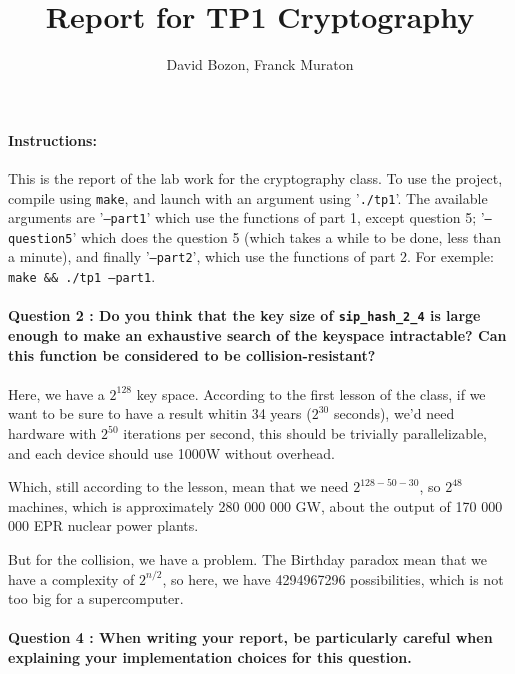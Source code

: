 \documentclass[4apaper]{report}
\author{David Bozon, Franck Muraton}
\begin{document}
\title{Report for TP1 Cryptography}
\maketitle

\paragraph{Instructions: \\} This is the report of the lab work for the cryptography class. To use the project, compile using \texttt{make}, and launch with an argument using '\texttt{./tp1}'. The available arguments are '\texttt{--part1}' which use the functions of part 1, except question 5; '\texttt{--question5}' which does the question 5 (which takes a while to be done, less than a minute), and finally '\texttt{--part2}', which use the functions of part 2. For exemple: \texttt{make \&\& ./tp1 --part1}.

\paragraph{Question 2 : Do you think that the key size of \texttt{sip\_hash\_2\_4} is large enough to make an exhaustive search of the keyspace intractable? Can this function be considered to be collision-resistant?}

\paragraph{}Here, we have a $2^{128}$ key space. According to the first lesson of the class, if we want to be sure to have a result whitin 34 years ($2^{30}$ seconds), we'd need hardware with $2^{50}$ iterations per second, this should be trivially parallelizable, and each device should use 1000W without overhead.

Which, still according to the lesson, mean that we need $2^{128-50-30}$, so $2^{48}$ machines, which is approximately 280 000 000 GW, about the output of 170 000 000 EPR nuclear power plants.

But for the collision, we have a problem. The Birthday paradox mean that we have a complexity of $2^{n/2}$, so here, we have 4294967296 possibilities, which is not too big for a supercomputer.

\paragraph{Question 4 : When writing your report, be particularly careful when explaining your implementation
choices for this question.}
\end{document}
